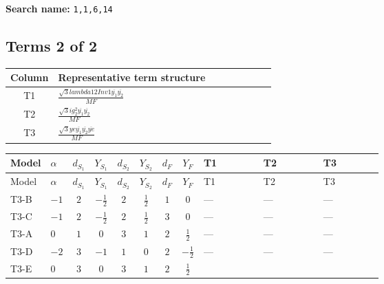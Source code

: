 \documentclass[8pt]{article}
\begin{document}
\begin{landscape}
\begin{longtable}{@{}llcccccc >{\raggedright\arraybackslash}p{0.21\linewidth} >{\raggedright\arraybackslash}p{0.21\linewidth} >{\raggedright\arraybackslash}p{0.21\linewidth}@{}}
\midrule
\bottomrule
\end{longtable}
\clearpage
\noindent\textbf{Search name: }\texttt{1,1,6,14}\par\smallskip
\subsection*{Terms 2 of 2}
\begin{center}
\begin{tabular}{@{}c >{\raggedright\arraybackslash}p{0.82\linewidth}@{}}
\toprule
Column & Representative term structure \\
\midrule
T1 & \(\displaystyle \frac{\sqrt{3} lambda12Inv1 \overline{y_{1}} \overline{y_{2}}}{MF}\) \\
\midrule
T2 & \(\displaystyle \frac{\sqrt{3} i g_{2}^{2} \overline{y_{1}} \overline{y_{2}}}{MF}\) \\
\midrule
T3 & \(\displaystyle \frac{\sqrt{3} ye \overline{y_{1}} \overline{y_{2}} \overline{ye}}{MF}\) \\
\midrule
\bottomrule
\end{tabular}
\end{center}
\smallskip
\tiny
\begin{longtable}{@{}llcccccc >{\raggedright\arraybackslash}p{0.21\linewidth} >{\raggedright\arraybackslash}p{0.21\linewidth} >{\raggedright\arraybackslash}p{0.21\linewidth}@{}}
\toprule
Model & $\alpha$ & $d_{S_1}$ & $Y_{S_1}$ & $d_{S_2}$ & $Y_{S_2}$ & $d_F$ & $Y_F$ & T1 & T2 & T3 \\
\midrule
\endfirsthead
\toprule
Model & $\alpha$ & $d_{S_1}$ & $Y_{S_1}$ & $d_{S_2}$ & $Y_{S_2}$ & $d_F$ & $Y_F$ & T1 & T2 & T3 \\
\midrule
\endhead
T3-B & $-1$ & $2$ & $-\frac{1}{2}$ & $2$ & $\frac{1}{2}$ & $1$ & $0$ & --- & --- & --- \\
\midrule
T3-C & $-1$ & $2$ & $-\frac{1}{2}$ & $2$ & $\frac{1}{2}$ & $3$ & $0$ & --- & --- & --- \\
\midrule
T3-A & $0$ & $1$ & $0$ & $3$ & $1$ & $2$ & $\frac{1}{2}$ & --- & --- & --- \\
\midrule
T3-D & $-2$ & $3$ & $-1$ & $1$ & $0$ & $2$ & $-\frac{1}{2}$ & --- & --- & --- \\
\midrule
T3-E & $0$ & $3$ & $0$ & $3$ & $1$ & $2$ & $\frac{1}{2}$ & \scriptsize\adjustbox{max width=\linewidth}{$\begin{gathered} \frac{\sqrt{3} lambda12Inv1 \overline{y_{1}} \overline{y_{2}}}{6 MF}\end{gathered}$} & \scriptsize\adjustbox{max width=\linewidth}{$\begin{gathered} - \frac{\sqrt{3} i g_{2}^{2} \overline{y_{1}} \overline{y_{2}}}{6 MF}\end{gathered}$} & \scriptsize\adjustbox{max width=\linewidth}{$\begin{gathered} \frac{\sqrt{3} ye \overline{y_{1}} \overline{y_{2}} \overline{ye}}{12 MF}\end{gathered}$} \\
\midrule
\bottomrule
\end{longtable}
\clearpage

\end{landscape}
\end{document}
